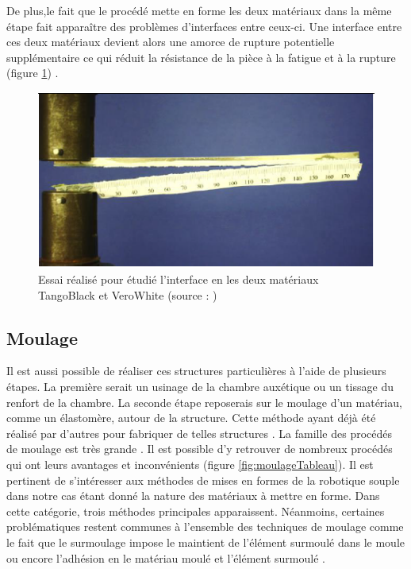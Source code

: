 \documentclass[10pt, a4paper]{article}
\begin{document}
   \quad De plus,le fait que le procédé mette en forme les deux matériaux dans la même étape fait apparaître des problèmes d'interfaces entre ceux-ci. Une interface entre ces deux matériaux devient alors une amorce de rupture potentielle supplémentaire ce qui réduit la résistance de la pièce à la fatigue et à la rupture (figure \ref{fig:essai}) \cite{Moore2015} \cite{Vu2014}. 
    
\begin{figure}[ht!]
\centering
\includegraphics[scale=1]{ImageIntro/EssaiInterfaceTBVW.PNG}
\caption{ Essai réalisé pour étudié l'interface en les deux matériaux TangoBlack et VeroWhite (source : \cite{Vu2014})}
\label{fig:essai}
\end{figure}
    
    \subsection{Moulage}
    
    Il est aussi possible de réaliser ces structures particulières à l'aide de plusieurs étapes. La première serait un usinage de la chambre auxétique ou un tissage du renfort de la chambre. La seconde étape reposerais sur le moulage d'un matériau, comme un élastomère, autour de la structure. Cette méthode ayant déjà été réalisé par d'autres pour fabriquer de telles structures \cite{Polygerinos2015}. La famille des procédés de moulage est très grande \cite{Schmitt2018}. Il est possible d'y retrouver de nombreux procédés qui ont leurs avantages et inconvénients (figure \ref{fig:moulageTableau}). Il est pertinent de s'intéresser aux méthodes de mises en formes de la robotique souple dans notre cas étant donné la nature des matériaux à mettre en forme. Dans cette catégorie, trois méthodes principales apparaissent. Néanmoins, certaines problématiques restent communes à l'ensemble des techniques de moulage comme le fait que le surmoulage impose le maintient de l'élément surmoulé dans le moule ou encore l'adhésion en le matériau moulé et l'élément surmoulé \cite{Schmitt2018}.
    
\end{document}
